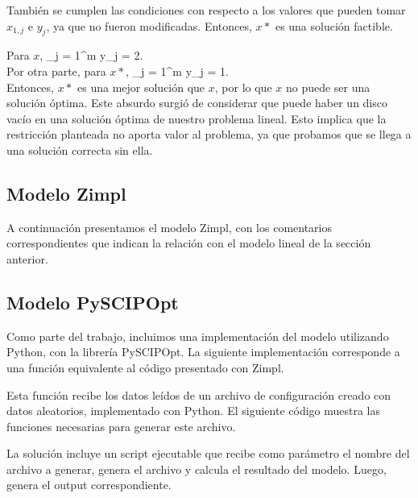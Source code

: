 \documentclass[11pt, a4paper, pdftex]{article}
\begin{document}
También se cumplen las condiciones con respecto a los valores que pueden tomar $x_{1, j}$ e $y_{j}$, ya que no fueron modificadas. Entonces, $x*$ es una solución factible.

Para $x$, \sum_{j = 1}^{m} y_{j} = 2.\\ Por otra parte, para $x*$, \sum_{j = 1}^{m} y_{j} = 1.\\

Entonces, $x*$ es una mejor solución que $x$, por lo que $x$ no puede ser una solución óptima. Este absurdo surgió de considerar que puede haber un disco vacío en una solución óptima de nuestro problema lineal. Esto implica que la restricción planteada no aporta valor al problema, ya que probamos que se llega a una solución correcta sin ella.


\subsection{Modelo Zimpl}

A continuación presentamos el modelo Zimpl, con los comentarios
correspondientes que indican la relación con el modelo lineal de la sección
anterior.



\newpage
\subsection{Modelo PySCIPOpt}

Como parte del trabajo, incluimos una implementación del modelo utilizando
Python, con la librería PySCIPOpt. La siguiente implementación corresponde 
a una función equivalente al código presentado con Zimpl.



\newpage

Esta función recibe los datos leídos de un archivo de configuración creado 
con datos aleatorios, implementado con Python. El siguiente código 
muestra las funciones necesarias para generar este archivo.



\newpage

La solución incluye un script ejecutable que recibe como parámetro el nombre del 
archivo a generar, genera el archivo y calcula el resultado del modelo. Luego, 
genera el output correspondiente.
\end{document}
